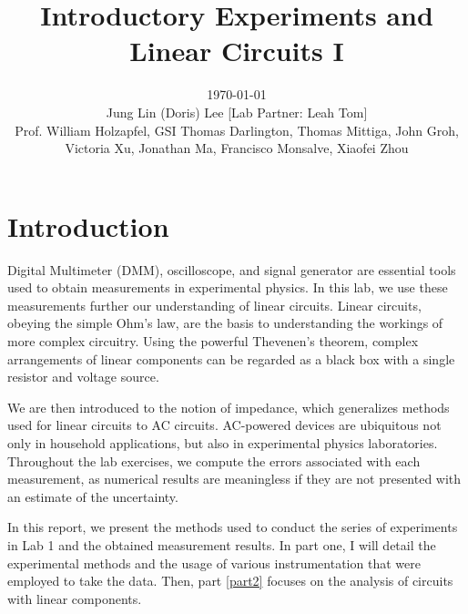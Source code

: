 \documentclass[authoryear, 12pt,5p, times]{elsarticle}
\begin{document}
\begin{frontmatter}
\title{Introductory Experiments and Linear Circuits I}
\author{\today \quad \\Jung Lin (Doris) Lee [Lab Partner: Leah Tom]\\Prof. William Holzapfel, GSI Thomas Darlington, Thomas Mittiga, John Groh,  \\Victoria Xu, Jonathan Ma, Francisco Monsalve, Xiaofei Zhou}
	 
\end{frontmatter}

\section*{Introduction\label{intro}}
\indent 
Digital Multimeter (DMM), oscilloscope, and signal generator are essential tools used to obtain measurements in experimental physics. In this lab, we use these measurements further our understanding of linear circuits.  Linear circuits, obeying the simple Ohm's law, are the basis to understanding the workings of more complex circuitry. Using the powerful Thevenen's theorem,  complex arrangements of linear components can be regarded as a black box with a single resistor and voltage source.  \par We are then introduced to the notion of impedance, which generalizes methods used for linear circuits to AC circuits. AC-powered devices are ubiquitous not only in household applications, but also in experimental physics laboratories. Throughout the lab exercises, we compute the errors associated with each measurement, as numerical results are meaningless if they are not presented with an estimate of the uncertainty.
 \par  In this report, we present the methods used to conduct the series of experiments in Lab 1 and the obtained measurement results. In part one, I will detail the experimental methods and the usage of various instrumentation that were employed to take the data.  Then, part \ref{part2} focuses on the analysis of circuits with linear components. 
\end{document}
